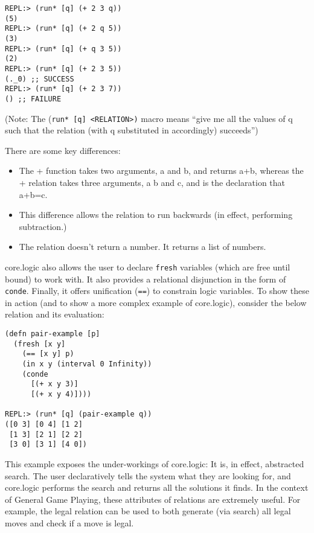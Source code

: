 \documentclass[letterpaper]{article}
\begin{document}
\begin{lstlisting}[frame=single, caption=The + relation]
REPL:> (run* [q] (+ 2 3 q))
(5)
REPL:> (run* [q] (+ 2 q 5))
(3)
REPL:> (run* [q] (+ q 3 5))
(2)
REPL:> (run* [q] (+ 2 3 5))
(._0) ;; SUCCESS
REPL:> (run* [q] (+ 2 3 7))
() ;; FAILURE
\end{lstlisting}

(Note: The (\texttt{run* [q] \textless RELATION\textgreater)} macro means ``give me all the values of q such that the relation (with q substituted in accordingly) succeeds'')

There are some key differences:
\begin{itemize}
\item The + function takes two arguments, a and b, and returns a+b, whereas the + relation takes three arguments, a b and c, and is the declaration that a+b=c.
\item This difference allows the relation to run backwards (in effect, performing subtraction.)
\item The relation doesn't return a number. It returns a list of numbers.
\end{itemize}

core.logic also allows the user to declare \texttt{fresh} variables (which are free until bound) to work with. It also provides a relational disjunction in the form of \texttt{conde}. Finally, it offers unification (\texttt{==}) to constrain logic variables. To show these in action (and to show a more complex example of core.logic), consider the below relation and its evaluation:

\begin{lstlisting}[frame=single, caption=Relation to generate all pairs of whole numbers (x y) such that x+y equals 3 or 4]
(defn pair-example [p]
  (fresh [x y]
    (== [x y] p)
    (in x y (interval 0 Infinity))
    (conde
      [(+ x y 3)]
      [(+ x y 4)])))

REPL:> (run* [q] (pair-example q))
([0 3] [0 4] [1 2]
 [1 3] [2 1] [2 2]
 [3 0] [3 1] [4 0])
\end{lstlisting}

This example exposes the under-workings of core.logic: It is, in effect, abstracted search. The user declaratively tells the system what they are looking for, and core.logic performs the search and returns all the solutions it finds. In the context of General Game Playing, these attributes of relations are extremely useful. For example, the legal relation can be used to both generate (via search) all legal moves and check if a move is legal.
\end{document}
